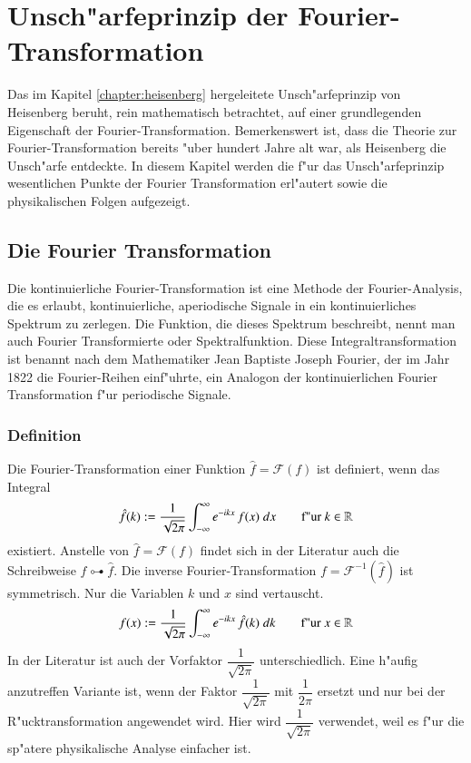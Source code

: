 \chapter{Unsch"arfeprinzip der Fourier-Transformation \label{chapter:heisenbergfourier}}
\begin{refsection}

Das im Kapitel \ref{chapter:heisenberg} hergeleitete Unsch"arfeprinzip von Heisenberg beruht, rein mathematisch betrachtet, auf einer grundlegenden Eigenschaft der Fourier-Transformation.
Bemerkenswert ist, dass die Theorie zur Fourier-Transformation bereits "uber hundert Jahre alt war, als Heisenberg die Unsch"arfe entdeckte.
In diesem Kapitel werden die f"ur das Unsch"arfeprinzip wesentlichen Punkte der Fourier Transformation erl"autert sowie die physikalischen Folgen aufgezeigt.

\section{Die Fourier Transformation}

Die kontinuierliche Fourier-Transformation ist eine Methode der Fourier-Analysis, die es erlaubt, kontinuierliche, aperiodische Signale in ein kontinuierliches Spektrum zu zerlegen.
Die Funktion, die dieses Spektrum beschreibt, nennt man auch Fourier Transformierte oder Spektralfunktion.
Diese Integraltransformation ist benannt nach dem Mathematiker Jean Baptiste Joseph Fourier, der im Jahr 1822 die Fourier-Reihen einf"uhrte, ein Analogon der kontinuierlichen Fourier Transformation f"ur periodische Signale.

\subsection{Definition}

Die Fourier-Transformation einer Funktion $\hat{f}=\mathcal{F}(f)$ ist definiert, wenn das Integral
\begin{equation}
\hat{f}(k) := \dfrac{1}{\sqrt{2\pi}}\int_{-\infty}^{\infty}e^{-i k x} \, f(x) \; dx \qquad \textnormal{f"ur } k \in \mathbb{R}
\end{equation}
existiert.
Anstelle von $\hat{f}=\mathcal{F}(f)$ findet sich in der Literatur auch die Schreibweise
$f \multimapdotbothA \hat{f}$.
Die inverse Fourier-Transformation $f=\mathcal{F}^{-1}(\hat{f})$ ist symmetrisch. Nur die Variablen $k$ und $x$ sind vertauscht.
\begin{equation}
f(x) := \dfrac{1}{\sqrt{2\pi}}\int_{-\infty}^{\infty}e^{-i k x} \, \hat{f}(k) \; dk \qquad \textnormal{f"ur } x \in \mathbb{R}
\end{equation}
In der Literatur ist auch der Vorfaktor $\dfrac{1}{\sqrt{2\pi}}$ unterschiedlich. Eine h"aufig anzutreffen Variante ist, wenn der Faktor $\dfrac{1}{\sqrt{2\pi}}$ mit $\dfrac{1}{2\pi}$ ersetzt und nur bei der R"ucktransformation angewendet wird.
Hier wird $\dfrac{1}{\sqrt{2\pi}}$ verwendet, weil es f"ur die sp"atere physikalische Analyse einfacher ist.


\end{refsection}
